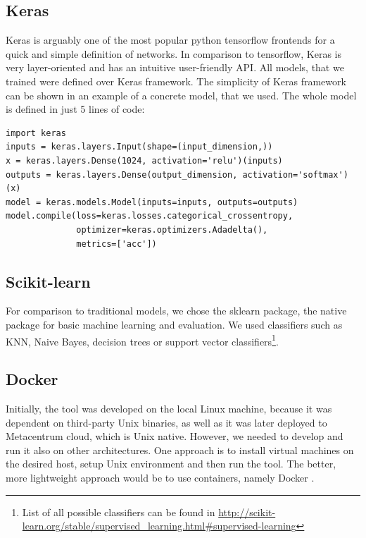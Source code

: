 \subsection{Keras}

Keras \cite{keras} is arguably one of the most popular python tensorflow frontends for a quick and simple definition of networks. In comparison to tensorflow, Keras is very layer-oriented and has an intuitive user-friendly API. All models, that we trained were defined over Keras framework. The simplicity of Keras framework can be shown in an example of a concrete model, that we used. The whole model is defined in just 5 lines of code:

\begin{verbatim}
import keras
inputs = keras.layers.Input(shape=(input_dimension,))
x = keras.layers.Dense(1024, activation='relu')(inputs)
outputs = keras.layers.Dense(output_dimension, activation='softmax')(x)
model = keras.models.Model(inputs=inputs, outputs=outputs)
model.compile(loss=keras.losses.categorical_crossentropy,
              optimizer=keras.optimizers.Adadelta(),
              metrics=['acc'])

\end{verbatim}

\subsection{Scikit-learn}
 
For comparison to traditional models, we chose the sklearn \cite{scikit} package, the native package for basic machine learning and evaluation. We used classifiers such as KNN, Naive Bayes, decision trees or support vector classifiers\footnote{List of all possible classifiers can be found in \url{http://scikit-learn.org/stable/supervised\_learning.html\#supervised-learning}}.  

\subsection{Docker}

\label{docker}

Initially, the tool was developed on the local Linux machine, because it was dependent on third-party Unix binaries, as well as it was later deployed to Metacentrum cloud, which is Unix native. However, we needed to develop and run it also on other architectures. One approach is to install virtual machines on the desired host, setup Unix environment and then run the tool. The better, more lightweight approach would be to use containers, namely Docker \cite{docker}.

